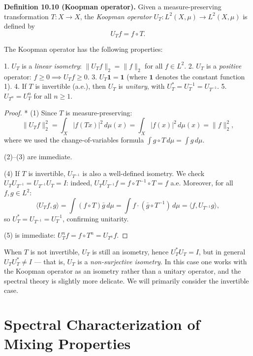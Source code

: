 \textbf{Definition 10.10 (Koopman operator).} Given a measure-preserving transformation $T: X \to X$, the \textit{Koopman operator} $U_T: L^2(X, \mu) \to L^2(X, \mu)$ is defined by
\begin{equation}\label{eq:10.4}\tag{10.4}
U_T f = f \circ T.
\end{equation}

\begin{proposition}\label{prop:10.11.}
The Koopman operator has the following properties:

1. $U_T$ is a \textit{linear isometry}: $\|U_T f\|_2 = \|f\|_2$ for all $f \in L^2$.
2. $U_T$ is a \textit{positive} operator: $f \ge 0 \implies U_T f \ge 0$.
3. $U_T \mathbf{1} = \mathbf{1}$ (where $\mathbf{1}$ denotes the constant function 1).
4. If $T$ is invertible (a.e.), then $U_T$ is \textit{unitary}, with $U_T^* = U_T^{-1} = U_{T^{-1}}$.
5. $U_{T^n} = U_T^n$ for all $n \ge 1$.
\end{proposition}


\begin{proof}
* (1) Since $T$ is measure-preserving:
\[
\|U_T f\|_2^2 = \int_X |f(Tx)|^2 \, d\mu(x) = \int_X |f(x)|^2 \, d\mu(x) = \|f\|_2^2,
\]
where we used the change-of-variables formula $\int g \circ T \, d\mu = \int g \, d\mu$.

(2)--(3) are immediate.

(4) If $T$ is invertible, $U_{T^{-1}}$ is also a well-defined isometry. We check $U_T U_{T^{-1}} = U_{T^{-1}} U_T = I$: indeed, $U_T U_{T^{-1}} f = f \circ T^{-1} \circ T = f$ a.e. Moreover, for all $f, g \in L^2$:
\[
\langle U_T f, g \rangle = \int (f \circ T) \bar{g} \, d\mu = \int f \cdot (\bar{g} \circ T^{-1}) \, d\mu = \langle f, U_{T^{-1}} g \rangle,
\]
so $U_T^* = U_{T^{-1}} = U_T^{-1}$, confirming unitarity.

(5) is immediate: $U_T^n f = f \circ T^n = U_{T^n} f$.
\end{proof}


When $T$ is not invertible, $U_T$ is still an isometry, hence $U_T^* U_T = I$, but in general $U_T U_T^* \ne I$ --- that is, $U_T$ is a \textit{non-surjective isometry}. In this case one works with the Koopman operator as an isometry rather than a unitary operator, and the spectral theory is slightly more delicate. We will primarily consider the invertible case.


\section{Spectral Characterization of Mixing Properties}\label{sec:10.5}

